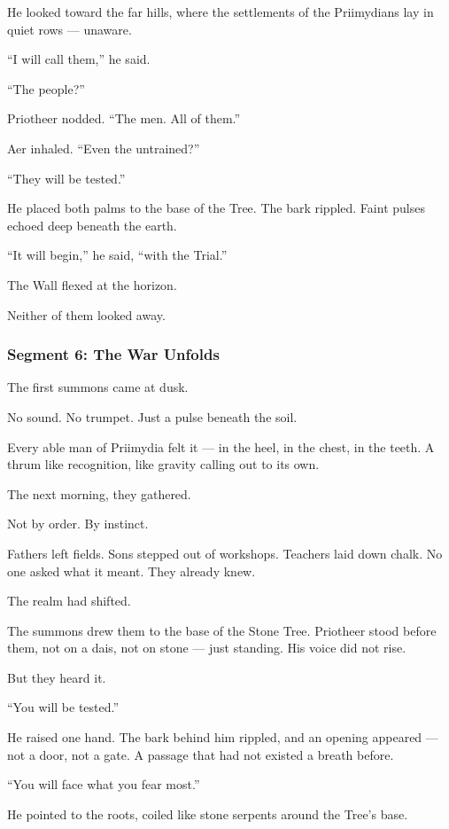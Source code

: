 \documentclass[9pt]{article}
\begin{document}
He looked toward the far hills, where the settlements of the Priimydians lay in quiet rows — unaware.

``I will call them,'' he said.

``The people?''

Priotheer nodded. ``The men. All of them.''

Aer inhaled. ``Even the untrained?''

``They will be tested.''

He placed both palms to the base of the Tree. The bark rippled. Faint pulses echoed deep beneath the earth.

``It will begin,'' he said, ``with the Trial.''

The Wall flexed at the horizon.

Neither of them looked away.


\newpage

\subsubsection*{Segment 6: The War Unfolds}

The first summons came at dusk.

No sound. No trumpet. Just a pulse beneath the soil.

Every able man of Priimydia felt it — in the heel, in the chest, in the teeth. A thrum like recognition, like gravity calling out to its own.

The next morning, they gathered.

Not by order. By instinct.

Fathers left fields. Sons stepped out of workshops. Teachers laid down chalk. No one asked what it meant. They already knew.

The realm had shifted.

The summons drew them to the base of the Stone Tree. Priotheer stood before them, not on a dais, not on stone — just standing. His voice did not rise.

But they heard it.

``You will be tested.''

He raised one hand. The bark behind him rippled, and an opening appeared — not a door, not a gate. A passage that had not existed a breath before.

``You will face what you fear most.''

He pointed to the roots, coiled like stone serpents around the Tree’s base.
\end{document}
